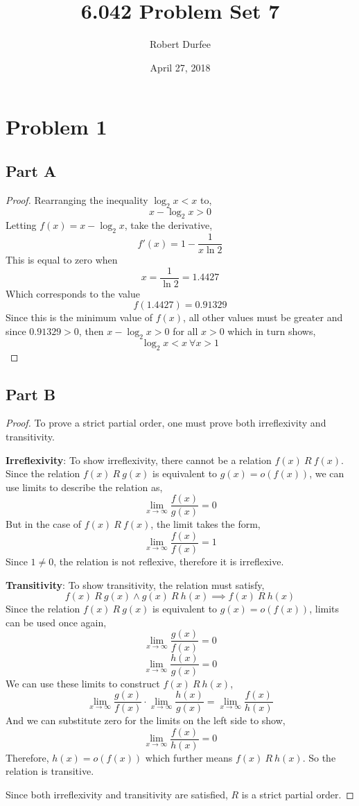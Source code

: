 \documentclass{article}
\title{6.042 Problem Set 7}
\author{Robert Durfee}
\date{April 27, 2018}
\begin{document}
\maketitle

\section*{Problem 1}

\subsection*{Part A}

\begin{proof}
  Rearranging the inequality $\log_2 x < x$ to,
  $$ x - \log_2 x > 0 $$
  Letting $f(x) = x - \log_2 x$, take the derivative,
  $$ f'(x) = 1 - \frac{1}{x \ln 2} $$
  This is equal to zero when
  $$ x = \frac{1}{\ln 2} = 1.4427 $$
  Which corresponds to the value
  $$ f(1.4427) = 0.91329 $$
  Since this is the minimum value of $f(x)$, all other values must be greater
  and since $0.91329 > 0$, then $x - \log_2 x > 0$ for all $x > 0$ which in turn
  shows, $$ \log_2 x < x\ \forall x > 1 $$
\end{proof}

\break

\subsection*{Part B}

\begin{proof}
  To prove a strict partial order, one must prove both irreflexivity and
  transitivity. 

  \bigbreak

  \textbf{Irreflexivity}: To show irreflexivity, there cannot be a relation
  $f(x)\ R\ f(x)$. Since the relation $f(x)\ R\ g(x)$ is equivalent to $g(x) =
  o(f(x))$, we can use limits to describe the relation as,
  $$ \lim_{x \to \infty} \frac{f(x)}{g(x)} = 0$$
  But in the case of $f(x)\ R\ f(x)$, the limit takes the form,
  $$ \lim_{x \to \infty} \frac{f(x)}{f(x)} = 1$$
  Since $1 \neq 0$, the relation is not reflexive, therefore it is irreflexive.

  \bigbreak

  \textbf{Transitivity}: To show transitivity, the relation must satisfy,
  $$ f(x)\ R\ g(x) \land g(x)\ R\ h(x) \implies f(x)\ R\ h(x) $$
  Since the relation $f(x)\ R\ g(x)$ is equivalent to $g(x) = o(f(x))$, limits
  can be used once again,
  $$ \lim_{x \to \infty} \frac{g(x)}{f(x)} = 0 $$
  $$ \lim_{x \to \infty} \frac{h(x)}{g(x)} = 0 $$
  We can use these limits to construct $f(x)\ R\ h(x)$,
  $$ \lim_{x \to \infty} \frac{g(x)}{f(x)} \cdot \lim_{x \to \infty}
  \frac{h(x)}{g(x)} = \lim_{x \to \infty} \frac{f(x)}{h(x)} $$
  And we can substitute zero for the limits on the left side to show,
  $$ \lim_{x \to \infty} \frac{f(x)}{h(x)} = 0 $$
  Therefore, $h(x) = o(f(x))$ which further means $f(x)\ R\ h(x)$. So the
  relation is transitive.

  \bigbreak

  Since both irreflexivity and transitivity are satisfied, $R$ is a strict
  partial order.
\end{proof}
\end{document}
